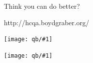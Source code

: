 \documentclass[compress]{beamer}
\newcommand{\fsi}[2]{
\begin{frame}[plain]
\vspace*{-1pt}
\makebox[\linewidth]{\texttt{[image: \#1]}}
\begin{center}
#2
\end{center}
\end{frame}
}
\newcommand{\gfxq}[2]{
\begin{center}
	\texttt{[image: qb/\#1]}
\end{center}
}
\begin{document}
\begin{frame}{Think you can do better?}

\begin{center}
\huge
http://hcqa.boydgraber.org/
\end{center}


\end{frame}


\begin{frame}[plain]
\gfxq{seattle_crowd}{.5}
\gfxq{chicago_crowd}{.5}
\end{frame}

\fsi{qb/boring_dot_products}{}



\begin{frame}[plain]
\vspace*{-1pt}
\end{frame}
\end{document}
